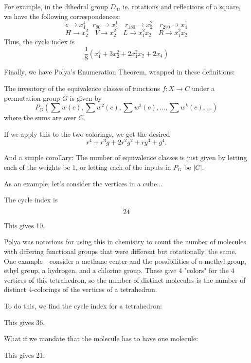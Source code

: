 \documentclass[11pt,twosided]{article}
\begin{document}
For example, in the dihedral group $D_4$, ie. rotations and reflections of a square, we have the following correspondences: 
\[
	e \rightarrow x_1^4 \quad r_{90} \rightarrow x_4^1 \quad r_{180} \rightarrow x_2^2 \quad r_{270} \rightarrow x_4^1
\]	
\[
	H \rightarrow x_2^2 \quad V \rightarrow x_2^2 \quad L \rightarrow x_1^2x_2 \quad R \rightarrow x_1^2x_2
\]	
Thus, the cycle index is 
\[
	\frac{1}{8}(x_1^4 + 3x_2^2 + 2x_1^2 x_2 + 2 x_4)
\]

Finally, we have Polya's Enumeration Theorem, wrapped in these definitions: 
\begin{theorem}
The inventory of the equivalence classes of functions $f: X \rightarrow C$ under a permutation group $G$ is given by 
\[
	P_G\left(\sum w(c), \sum w^2(c), \sum w^3(c), \ldots, \sum w^k(c), \ldots \right) 
\]	
where the sums are over $C$. 
\end{theorem}

If we apply this to the two-colorings, we get the desired 
\[
	r^4 + r^3 g + 2 r^2 g^2 + rg^3 + g^4.
\]

And a simple corollary:
The number of equivalence classes is just given by letting each of the weights be $1$, or letting each of the inputs in $P_G$ be $|C|$. 


As an example, let's consider the vertices in a cube... 

The cycle index is 
\[
\frac{}{24}
\]


This gives 10. 

Polya was notorious for using this in chemistry to count the number of molecules with differing functional groups that were different but rotationally, the same. One example - consider a methane center and the possibilities of a methyl group, ethyl group, a hydrogen, and a chlorine group. These give 4 "colors" for the 4 vertices of this tetrahedron, so the number of distinct molecules is the number of distinct 4-colorings of the vertices of a tetrahedron. 

To do this, we find the cycle index for a tetrahedron: 

This gives 36. 

What if we mandate that the molecule has to have one molecule: 

This gives 21. 
 
\end{document}
